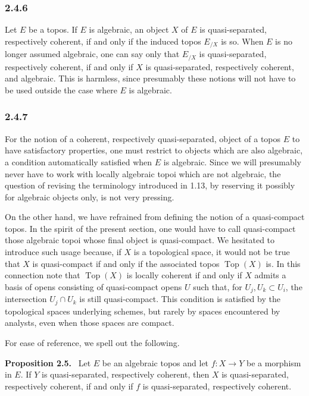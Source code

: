 \documentclass[11pt]{article}
\newcommand{\Top}{\operatorname{Top}}
\newenvironment{statement}[1]{\par\medskip\noindent\textbf{#1.}\ }{\par\medskip}
\begin{document}
\subsubsection*{2.4.6}
Let \(E\) be a topos. If \(E\) is algebraic, an object \(X\) of \(E\) is quasi-separated, respectively coherent, if and only if the induced topos \(E_{/X}\) is so. When \(E\) is no longer assumed algebraic, one can say only that \(E_{/X}\) is quasi-separated, respectively coherent, if and only if \(X\) is quasi-separated, respectively coherent, and algebraic. This is harmless, since presumably these notions will not have to be used outside the case where \(E\) is algebraic.

\subsubsection*{2.4.7}
For the notion of a coherent, respectively quasi-separated, object of a topos \(E\) to have satisfactory properties, one must restrict to objects which are also algebraic, a condition automatically satisfied when \(E\) is algebraic. Since we will presumably never have to work with locally algebraic topoi which are not algebraic, the question of revising the terminology introduced in 1.13, by reserving it possibly for algebraic objects only, is not very pressing.

On the other hand, we have refrained from defining the notion of a quasi-compact topos. In the spirit of the present section, one would have to call quasi-compact those algebraic topoi whose final object is quasi-compact. We hesitated to introduce such usage because, if \(X\) is a topological space, it would not be true that \(X\) is quasi-compact if and only if the associated topos \(\Top(X)\) is. In this connection note that \(\Top(X)\) is locally coherent if and only if \(X\) admits a basis of opens consisting of quasi-compact opens \(U\) such that, for \(U_j,U_k\subset U_i\), the intersection \(U_j\cap U_k\) is still quasi-compact. This condition is satisfied by the topological spaces underlying schemes, but rarely by spaces encountered by analysts, even when those spaces are compact.

For ease of reference, we spell out the following.

\begin{statement}{Proposition 2.5}
Let \(E\) be an algebraic topos and let \(f:X\to Y\) be a morphism in \(E\). If \(Y\) is quasi-separated, respectively coherent, then \(X\) is quasi-separated, respectively coherent, if and only if \(f\) is quasi-separated, respectively coherent.
\end{statement}
\end{document}
